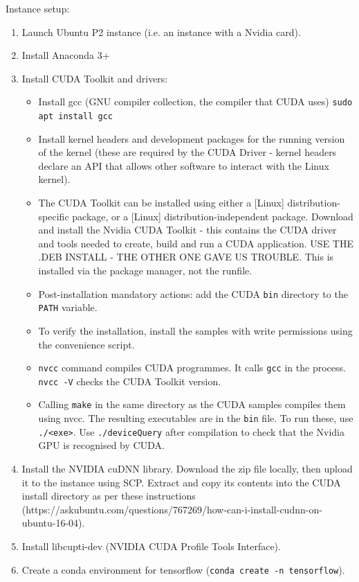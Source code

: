 \documentclass[idxtotoc,hyperref,openany]{labbook} %
\begin{document}
Instance setup:
\begin{enumerate}
	\item Launch Ubuntu P2 instance (i.e. an instance with a Nvidia card).
	\item Install Anaconda 3+
	\item Install CUDA Toolkit and drivers:
	\begin{itemize}
	\item Install gcc (GNU compiler collection, the compiler that CUDA uses) \texttt{sudo apt install gcc}
	\item Install kernel headers and development packages for the running version of the kernel (these are required by the CUDA Driver - kernel headers declare an API that allows other software to interact with the Linux kernel).
	\item The CUDA Toolkit can be installed using either a [Linux] distribution-specific package, or a [Linux] distribution-independent package. Download and install the Nvidia CUDA Toolkit - this contains the CUDA driver and tools needed to create, build and run a CUDA application. USE THE .DEB INSTALL - THE OTHER ONE GAVE US TROUBLE. This is installed via the package manager, not the runfile.
	\item Post-installation mandatory actions: add the CUDA \texttt{bin} directory to the \texttt{PATH} variable.
	\item To verify the installation, install the samples with write permissions using the convenience script.
	\item \texttt{nvcc} command compiles CUDA programmes. It calls \texttt{gcc} in the process. \texttt{nvcc -V} checks the CUDA Toolkit version.
	\item Calling \texttt{make} in the same directory as the CUDA samples compiles them using nvcc. The resulting executables are in the \texttt{bin} file. To run these, use \texttt{./<exe>}. Use \texttt{./deviceQuery} after compilation to check that the Nvidia GPU is recognised by CUDA.
	\end{itemize}
	\item Install the NVIDIA cuDNN library. Download the zip file locally, then upload it to the instance using SCP. Extract and copy its contents into the CUDA install directory as per these instructions (https://askubuntu.com/questions/767269/how-can-i-install-cudnn-on-ubuntu-16-04).
	\item  Install libcupti-dev (NVIDIA CUDA Profile Tools Interface).
	\item Create a conda environment for tensorflow (\texttt{conda create -n tensorflow}).

\end{enumerate}
\end{document}
